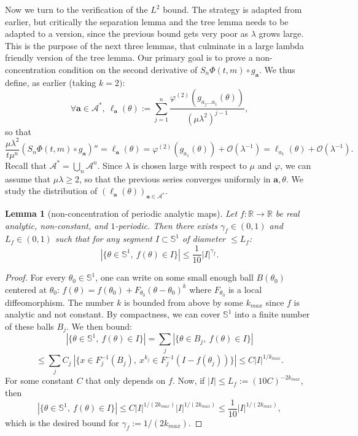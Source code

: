 \documentclass[11pt]{amsart}
\theoremstyle{plain}
\newtheorem{lemma}[theorem]{Lemma}
\theoremstyle{definition}
\numberwithin{equation}{section}
\begin{document}
Now we turn to the verification of the $L^2$ bound. The strategy is adapted from earlier, but critically the separation lemma and the tree lemma needs to be adapted to a  version, since the previous bound gets very poor as $\lambda$ grows large. This is the purpose of the next three lemmas, that culminate in a large lambda friendly version of the tree lemma. Our primary goal is to prove a non-concentration condition on the second derivative of $S_n \Phi(t,m) \circ g_\mathbf{a}$. We thus define, as earlier (taking $k=2)$: 
$$ \forall \mathbf{a} \in \mathcal{A}^*, \ \ell_\mathbf{a}(\theta) := \sum_{j=1}^{n} \frac{ \varphi^{(2)}(g_{a_j \dots a_1}(\theta))}{(\mu \lambda^2)^{j-1}} ,$$
so that 
$$\frac{\mu\lambda^2}{t\mu^n}(S_n \Phi(t,m) \circ g_\mathbf{a})'' = \ell_{\mathbf{a}}(\theta) = \varphi^{(2)}(g_{a_1}(\theta)) + \mathcal{O}(\lambda^{-1}) = \ell_{a_1}(\theta)+\mathcal{O}(\lambda^{-1}).$$ 
Recall that $\mathcal{A}^* = \bigcup_n \mathcal{A}^n.$
Since $\lambda$ is chosen large with respect to $\mu$ and $\varphi$, we can assume that $\mu \lambda \geq 2$, so that the previous series converges uniformly in $\mathbf{a},\theta$. We study the distribution of $(\ell_\mathbf{a}(\theta))_{\mathbf{a} \in \mathcal{A}^*}$.
\begin{lemma}[non-concentration of periodic analytic maps]
Let $f:\mathbb{R} \rightarrow \mathbb{R}$ be real analytic, non-constant, and $1$-periodic. Then there exists $\gamma_f \in (0,1)$ and $L_f\in(0,1)$ such that for any segment $I \subset \mathbb{S}^1$ of diameter $\leq L_f$: 
$$ |\{ \theta \in \mathbb{S}^1, \ f(\theta) \in I \}| \leq \frac{1}{10} {|I|^{\gamma_f}}. $$
\end{lemma}

\begin{proof}
For every $\theta_0 \in \mathbb{S}^1$, one can write on some small enough ball $B(\theta_0)$ centered at $\theta_0$: $f(\theta) = f(\theta_0)+F_{\theta_0}(\theta-\theta_0)^{k}$ where $F_{\theta_0}$ is a local diffeomorphism. The number $k$ is bounded from above by some $k_{max}$ since $f$ is analytic and not constant. By compactness, we can cover $\mathbb{S}^1$ into a finite number of these balls $B_j$. We then bound:
$$ |\{ \theta \in \mathbb{S}^1, \ f(\theta) \in I \}| = \sum_j |\{ \theta \in B_j, \ f(\theta) \in I \}|$$
$$ \leq \sum_j C_j \ |\{ x \in F_j^{-1}(B_j), \ x^{k_j} \in F_j^{-1}(I-f(\theta_j)) \}| \leq C|I|^{1/k_{max}}. $$
For some constant $C$ that only depends on $f$. Now, if $|I|\leq L_f := (10 C)^{-2k_{max}}$, then
$$ |\{ \theta \in \mathbb{S}^1, \ f(\theta) \in I \}|
\leq C |I|^{1/(2k_{max})} |I|^{1/(2k_{max})}
\leq \frac{1}{10}|I|^{1/(2k_{max})}, $$
which is the desired bound for $\gamma_f := 1/(2k_{max})$.
\end{proof}
\end{document}
